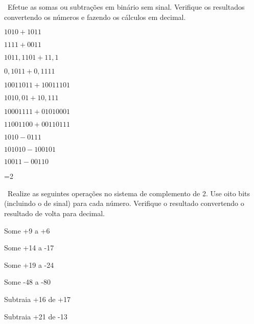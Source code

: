 \exercise\ Efetue as somas ou subtrações em binário sem sinal.
Verifique os resultados convertendo os números e fazendo os cálculos
em decimal.
\bigskip
\begin{enumerate}[a)]
  \begin{minipage}{.35\linewidth}
  \item $1010+1011$
  \item $1111+0011$
  \item $1011,1101+11,1$
  \item $0,1011+0,1111$
  \item $10011011+10011101$
  \item $1010,01+10,111$
  \end{minipage}
   \begin{minipage}{.35\linewidth}
   \item $10001111+01010001$
   \item $11001100+00110111$
   \item $1010-0111$
   \item $101010-100101$
   \item $10011-00110$
   \end{minipage}
\end{enumerate}

=2

\exercise\ Realize as seguintes operações no sistema de complemento de 2. Use 
oito bits (incluindo o de sinal) para cada número. Verifique o resultado convertendo 
o resultado de volta para decimal.
\bigskip
\begin{enumerate}[a)]
  \begin{minipage}{.45\linewidth}
    \item Some +9 a +6
    \item Some +14 a -17
    \item Some +19 a -24
    \item Some -48 a -80
    \item Subtraia +16 de +17
    \item Subtraia +21 de -13
  \end{minipage}
\end{enumerate}

